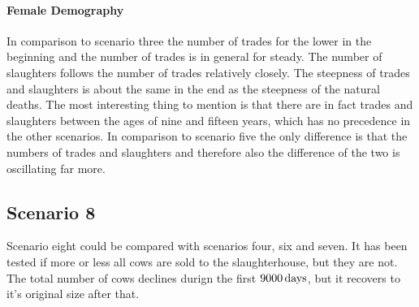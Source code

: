 \paragraph{Female Demography}
In comparison to scenario three the number of trades for the lower in the beginning and the number of trades is in general for steady. The number of slaughters follows the number of trades relatively closely. The steepness of trades and slaughters is about the same in the end as the steepness of the natural deaths. The most interesting thing to mention is that there are in fact trades and slaughters between the ages of nine and fifteen years, which has no precedence in the other scenarios.
In comparison to scenario five the only difference is that the numbers of trades and slaughters and therefore also the difference of the two is oscillating far more.



\subsection{Scenario 8}
Scenario eight could be compared with scenarios four, six and seven. It has been tested if more or less all cows are sold to the slaughterhouse, but they are not. The total number of cows declines durign the first $9000\,\text{days}$, but it recovers to it's original size after that.
